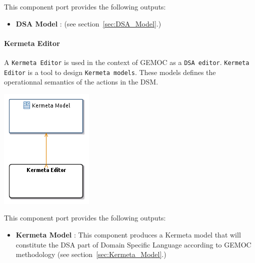 \documentclass{gemoc} %
\begin{document}
This component port provides the following outputs:
\begin{itemize}
  \item \textbf{DSA Model} :
(see section~\ref{sec:DSA_Model}.)
\end{itemize}

\paragraph{Kermeta Editor}
\label{sec:Kermeta_Editor}
A \texttt{Kermeta Editor} is used in the context of GEMOC as a \texttt{DSA editor}.
\texttt{Kermeta Editor} is a tool to design \texttt{Kermeta models}. These models defines the operationnal semantics of the actions in the DSM.
\begin{center}
\includegraphics*[trim=0.0cm 0.0cm 0cm 0.0cm, clip=true]{../images/generated/Generated_Kermeta_Editor.png}
\end{center}


This component port provides the following outputs:
\begin{itemize}
  \item \textbf{Kermeta Model} :
This component produces a Kermeta model that will constitute the DSA part of Domain Specific Language according to GEMOC methodology 
(see section~\ref{sec:Kermeta_Model}.)
\end{itemize}
\end{document}
